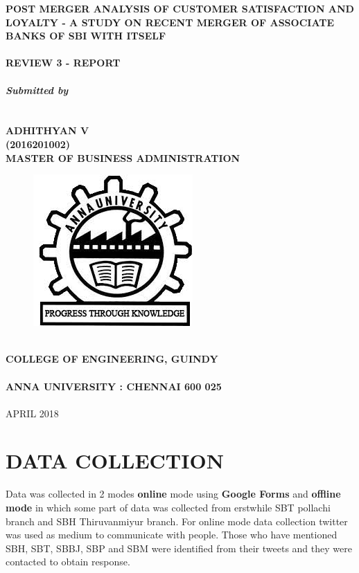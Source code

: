 \documentclass[a4paper, 14pt]{article}
\newcommand\tab[1][1cm]{\hspace*{#1}}
\begin{document}
\selectfont
{
\begin{center}	
\textbf{\fontsize{18}{2} \selectfont POST MERGER ANALYSIS OF CUSTOMER SATISFACTION AND LOYALTY - A STUDY ON RECENT MERGER OF ASSOCIATE BANKS OF SBI WITH ITSELF}\\
\tab \\
\textbf{\fontsize{14}{2} \selectfont REVIEW 3 - REPORT}\\
\tab \\
\textbf{\fontsize{14}{2} \selectfont \emph{Submitted by}}\\
\tab \\
\tab \\
{\fontsize{16}{2} \selectfont
\textbf{ADHITHYAN V}}\\
{\fontsize{16}{2} \selectfont \textbf{(2016201002)}}\\

\textbf{\fontsize{16}{2} \selectfont MASTER OF BUSINESS ADMINISTRATION}\\
\begin{figure}[H]
\centering
\includegraphics[scale=0.5]{anna_univ_logo.jpg}
\end{figure}
\tab \\
\textbf{\fontsize{14}{2} \selectfont COLLEGE OF ENGINEERING, GUINDY}\\
\tab \\
\textbf{\fontsize{16}{2} \selectfont ANNA UNIVERSITY : CHENNAI 600 025}\\
\tab \\
{\fontsize{14}{2} \selectfont APRIL 2018}\\
\end{center}
\newpage
\section*{DATA COLLECTION}
Data was collected in 2 modes \textbf{online} mode using \textbf{Google Forms} and \textbf{offline mode} in which some part of data was collected from erstwhile SBT pollachi branch and SBH Thiruvanmiyur branch. For online mode data collection twitter was used as medium to communicate with people. Those who have mentioned SBH, SBT, SBBJ, SBP and SBM were identified from their tweets and they were contacted to obtain response.
}
\end{document}
